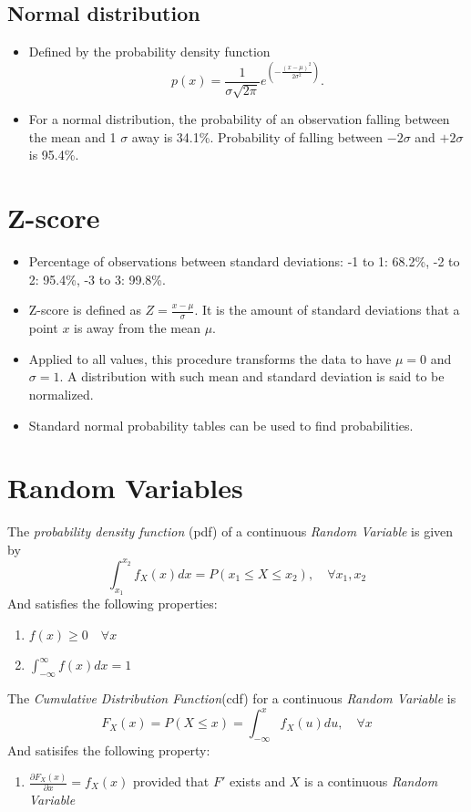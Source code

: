 \documentclass[a4paper,11pt]{book}
\begin{document}
\subsection*{Normal distribution}

\begin{itemize}
\item Defined by the probability density function $$p(x) = \frac{1}{\sigma\sqrt{2\pi}}e^{(-\frac{(x-\mu)^2}{2\sigma^2})}.$$
\item For a normal distribution, the probability of an observation falling between the mean and 1 $\sigma$ away is 34.1\%. Probability of falling between $-2\sigma$ and $+2\sigma$ is 95.4\%.
\end{itemize}

\section*{Z-score}
\begin{itemize}
\item Percentage of observations between standard deviations: -1 to 1: 68.2\%, -2 to 2: 95.4\%, -3 to 3: 99.8\%.
\item Z-score is defined as $Z = \frac{x-\mu}{\sigma}$. It is the amount of standard deviations that a point $x$ is away from the mean $\mu$.
\item Applied to all values, this procedure transforms the data to have $\mu=0$ and $\sigma=1$. A distribution with such mean and standard deviation is said to be normalized.
\item Standard normal probability tables can be used to find probabilities.
\end{itemize}


\section*{Random Variables}
The \emph{probability density function} (pdf) of a continuous \emph{Random Variable} is given by 
$$\int_{x_1}^{x_2}f_X(x)dx=P(x_1\leq X\leq x_2), \quad \forall x_1,x_2$$
And satisfies the following properties:
\begin{enumerate}
\item $f(x)\geq 0 \quad \forall x$
\item $\int_{-\infty}^{\infty}f(x)dx=1$
\end{enumerate}

The \emph{Cumulative Distribution Function}(cdf) for a continuous \emph{Random Variable} is 
$$F_X(x)=P(X \leq x) = \int_{-\infty}^{x}f_X(u)du, \quad \forall x$$
And satisifes the following property:
\begin{enumerate}
\item $\frac{\partial F_X(x)}{\partial x}=f_X(x)$ provided that $F'$ exists and $X$ is a continuous \emph{Random Variable}
\end{enumerate}
\end{document}
